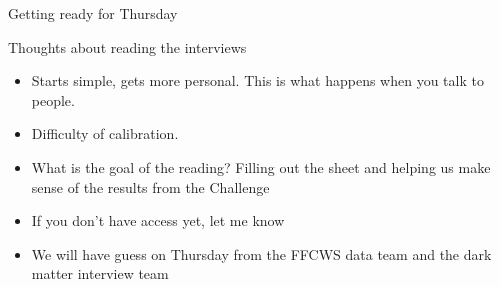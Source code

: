 \documentclass[aspectratio=169]{beamer}
\begin{document}
\begin{frame}

Getting ready for Thursday

\end{frame}
\begin{frame}

Thoughts about reading the interviews
\begin{itemize}
\item Starts simple, gets more personal.  This is what happens when you talk to people. \pause
\item Difficulty of calibration. \pause
\item What is the goal of the reading? Filling out the sheet and helping us make sense of the results from the Challenge \pause
\item If you don't have access yet, let me know \pause
\item We will have guess on Thursday from the FFCWS data team and the dark matter interview team \pause
\end{itemize}

\end{frame}




\frame{\titlepage}
\end{document}
